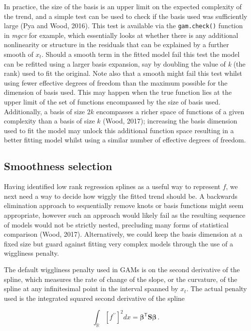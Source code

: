 \documentclass[12pt,]{article}
\begin{document}
In practice, the size of the basis is an upper limit on the expected
complexity of the trend, and a simple test can be used to check if the
basis used was sufficiently large (Pya and Wood, 2016). This test is
available via the \texttt{gam.check()} function in \emph{mgcv} for
example, which essentially looks at whether there is any additional
nonlinearity or structure in the residuals that can be explained by a
further smooth of \(x_t\). Should a smooth term in the fitted model fail
this test the model can be refitted using a larger basis expansion, say
by doubling the value of \emph{k} (the rank) used to fit the original.
Note also that a smooth might fail this test whilst using fewer
effective degrees of freedom than the maximum possible for the dimension
of basis used. This may happen when the true function lies at the upper
limit of the set of functions encompassed by the size of basis used.
Additionally, a basis of size \(2k\) encompasses a richer space of
functions of a given complexity than a basis of size \(k\) (Wood, 2017);
increasing the basis dimension used to fit the model may unlock this
additional function space resulting in a better fitting model whilst
using a similar number of effective degrees of freedom.

\subsection{Smoothness selection}\label{smoothness-selection}

Having identified low rank regression splines as a useful way to
represent \(f\), we next need a way to decide how wiggly the fitted
trend should be. A backwards elimination approach to sequentially remove
knots or basis functions might seem appropriate, however such an
approach would likely fail as the resulting sequence of models would not
be strictly nested, precluding many forms of statistical comparison
(Wood, 2017). Alternatively, we could keep the basis dimension at a
fixed size but guard against fitting very complex models through the use
of a wiggliness penalty.

The default wiggliness penalty used in GAMs is on the second derivative
of the spline, which measures the rate of change of the slope, or the
curvature, of the spline at any infinitesimal point in the interval
spanned by \(x_t\). The actual penalty used is the integrated squared
second derivative of the spline

\begin{equation} \label{eq:quadratic-penalty}
\int_{\mathbb{R}} [f^{\prime\prime}]^2 dx = \boldsymbol{\beta}^{\mathsf{T}}\mathbf{S}\boldsymbol{\beta}\, .
\end{equation}
\end{document}
